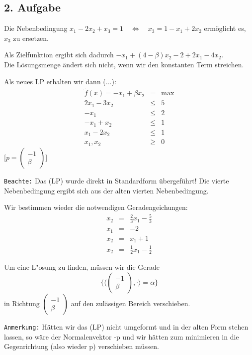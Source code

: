 \documentclass[a4paper,11pt,twoside,titlepage]{article}
\begin{document}
\subsection*{2. Aufgabe}
Die Nebenbedingung $x_1-2x_2+x_3=1\quad\Leftrightarrow\quad x_3=1-x_1+2x_2$ ermöglicht es, $x_3$ zu ersetzen.

Als Zielfunktion ergibt sich dadurch $-x_1+(4-\beta)x_2-2+2x_1-4x_2$.\\
Die Lösungsmenge ändert sich nicht, wenn wir den konstanten Term streichen.

Als neues LP erhalten wir dann (...):
\setcounter{equation}{0}
\begin{eqnarray}
\widetilde{f}(x)=-x_1+\beta x_2&=&\max\nonumber\\
2x_1-3x_2&\leq&5\\
-x_1&\leq&2\\
-x_1+x_2&\leq&1\\
x_1-2x_2&\leq&1\\
x_1,x_2&\geq&0\nonumber
\end{eqnarray}
[$p=\left(\begin{array}{c}
-1\\\beta
\end{array}\right)$]

\texttt{Beachte:} Das (LP) wurde direkt in Standardform übergeführt! Die vierte Nebenbedingung ergibt sich aus der alten vierten Nebenbedingung.

Wir bestimmen wieder die notwendigen Geradengeichungen:
\setcounter{equation}{0}
\begin{eqnarray}
x_2&=&\frac{2}{3}x_1-\frac{5}{3}\\
x_1&=&-2\\
x_2&=&x_1+1\\
x_2&=&\frac{1}{2}x_1-\frac{1}{2}
\end{eqnarray}

Um eine L"osung zu finden, müssen wir die Gerade \[\{\langle\left(\begin{array}{c}
-1\\\beta
\end{array}\right),\cdot\rangle=\alpha\}\]
in Richtung $\left(\begin{array}{c}
-1\\\beta
\end{array}\right)$ auf den zulässigen Bereich verschieben.

\texttt{Anmerkung:} Hätten wir das (LP) nicht umgeformt und in der alten Form stehen lassen, so wäre der Normalenvektor -p und wir hätten zum minimieren in die Gegenrichtung (also wieder p) verschieben müssen.
\end{document}
